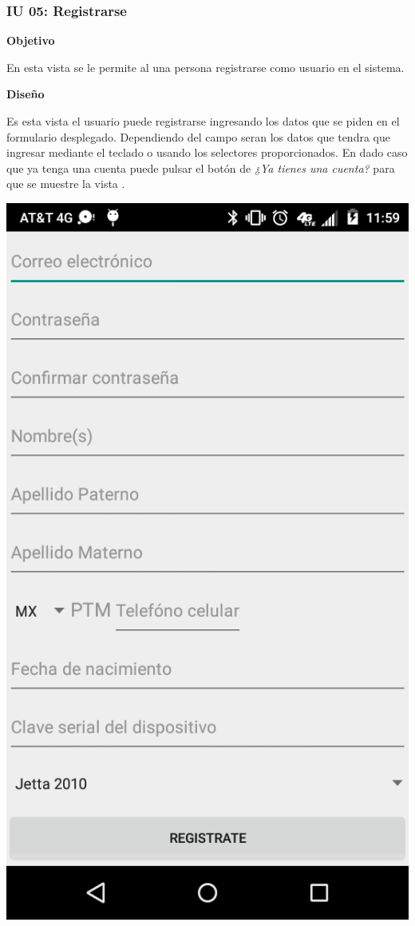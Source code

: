   \subsubsection{IU 05: Registrarse} \label{iu05}
  \textbf{Objetivo} \par
  En esta vista se le permite al una persona registrarse como usuario en el sistema. \par
  \textbf{Diseño} \par
  Es esta vista el usuario puede registrarse ingresando los datos que se piden en el formulario desplegado. Dependiendo del campo seran los datos que tendra que ingresar mediante el teclado o usando los selectores proporcionados. En dado caso que ya tenga una cuenta puede pulsar el botón de \textit{¿Ya tienes una cuenta?} para que se muestre la vista \textbf{}.
    \begin{center}
      \includegraphics[scale=.2]{Capitulo3/img/gui/IU_Registrarse_(1).png}

\end{center}
